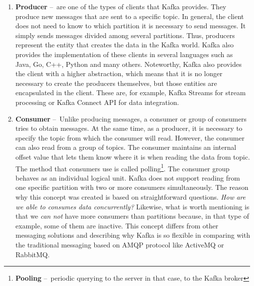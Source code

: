 \begin{enumerate}
    \item \textbf{Producer} \---\ are one of the types of clients that Kafka provides. They produce new messages that are sent to a specific topic. In general, the client does not need to know to which partition it is necessary to send messages. It simply sends messages divided among several partitions. Thus, producers represent the entity that creates the data in the Kafka world. Kafka also provides the implementation of these clients in several languages such as Java, Go, C++, Python and many others. Noteworthy, Kafka also provides the client with a higher abstraction, which means that it is no longer necessary to create the producers themselves, but those entities are encapsulated in the client. These are, for example, Kafka Streams for stream processing or Kafka Connect API for data integration.
    
    \item \textbf{Consumer} \---\ Unlike producing messages, a consumer or group of consumers tries to obtain messages. At the same time, as a producer, it is necessary to specify the topic from which the consumer will read. However, the consumer can also read from a group of topics. The consumer maintains an internal offset value that lets them know where it is when reading the data from topic. The method that consumers use is called polling\footnote{\textbf{Pooling} \---\ periodic querying to the server in that case, to the Kafka broker}. The consumer group behaves as an individual logical unit. Kafka does not support reading from one specific partition with two or more consumers simultaneously. The reason why this concept was created is based on straightforward questions. \emph{How are we able to consumes data concurrently?} Likewise, what is worth mentioning is that we \emph{can not} have more consumers than partitions because, in that type of example, some of them are inactive. This concept differs from other messaging solutions and describing why Kafka is so flexible in comparing with the traditional messaging based on AMQP protocol like ActiveMQ or RabbitMQ.
    

\end{enumerate}
